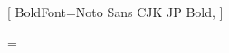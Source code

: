 \setfontface{}[
    BoldFont={Noto Sans CJK JP Bold},
]
\chardef{}

\makeatletter
\ifx\e@alloc@intercharclass@top\@undefined
    \chardef{}
\else
    \chardef\CharBound=\e@alloc@intercharclass@top
\fi
\makeatother


